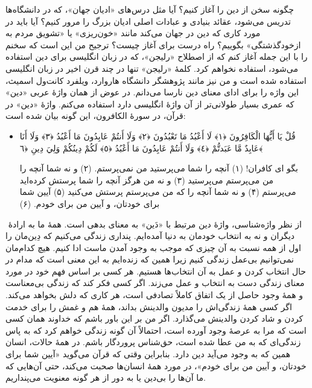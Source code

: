 چگونه سخن از دین را آغاز کنیم؟ آیا مثل درس‌های «ادیان جهان»، که در دانشگاه‌ها تدریس می‌شود، عقائد بنیادی و عبادات اصلی ادیان بزرگ را مرور کنیم؟ آیا باید در مورد کاری که دین در جهان می‌کند مانند «خون‌ریزی» یا «تشویق مردم به ازخودگذشتگی» بگوییم؟ راه درست برای آغاز چیست؟ ترجیح من این است که سخنم را با این جمله آغاز کنم که از اصطلاح «رلیجن»،
که در زبان انگلیسی برای دین استفاده می‌شود، استفاده نخواهم کرد. کلمهٔ «رلیجن» تنها در چند قرن اخیر در زبان انگلیسی استفاده شده است و من نیز مانند پژوهشگر دانشگاه هاروارد، ویلفرد کانت‌ول اسمیث، این واژه را برای ادای معنای دین نارسا می‌دانم. در عوض از همان واژهٔ عربی «دین» که عمری بسیار طولانی‌تر از آن واژهٔ انگلیسی دارد استفاده می‌کنم. واژهٔ «دین» در قرآن، در سورهٔ الکافرون، این گونه بیان شده است:

\begin{itemize}
	\item[]
	
	{
		قُلْ يَا أَيُّهَا الْكَافِرُونَ ﴿١﴾ لَا أَعْبُدُ مَا تَعْبُدُونَ ﴿٢﴾ وَلَا أَنتُمْ عَابِدُونَ مَا أَعْبُدُ ﴿٣﴾ وَلَا أَنَا عَابِدٌ مَّا عَبَدتُّمْ ﴿٤﴾ وَلَا أَنتُمْ عَابِدُونَ مَا أَعْبُدُ ﴿٥﴾ لَكُمْ دِينُكُمْ وَلِيَ دِينِ ﴿٦﴾
	}
	
	{
		بگو ای کافران! (۱) آنچه را شما می‌پرستید من نمی‌پرستم. (۲) و نه شما آنچه را من می‌پرستم می‌پرستید (۳) و نه من هرگز آنچه را شما پرستش کرده‌اید می‌پرستم (۴) و نه شما آنچه را که من می‌پرستم پرستش می‌کنید (۵)  آیین شما برای خودتان، و آیین من برای خودم. (۶)
	}
\end{itemize}
‍‍
از نظر واژه‌شناسی، واژهٔ دین مرتبط با «دَین» به معنای بدهی است. همهٔ ما به ارادهٔ‌ دیگران و نه به انتخاب خودمان به دنیا آمده‌ایم. پنداری زندگی می‌کنیم که دِین‌مان را اول از همه نسبت به آن چیزی که موجب به وجود آمدن ماست ادا کنیم. هیچ کدام‌مان نمی‌توانیم بی‌عمل زندگی کنیم زیرا همین که زنده‌ایم به این معنی است که مدام در حال انتخاب کردن و عمل به آن انتخاب‌ها هستیم. هر کسی بر اساس فهم خود در مورد معنای زندگی دست به انتخاب و عمل می‌زند. اگر کسی فکر کند که زندگی بی‌معناست و همهٔ‌ وجود حاصل از یک اتفاق کاملاً تصادفی است، هر کاری که دلش بخواهد می‌کند. اگر کسی همهٔ زندگی‌اش را مدیون والدینش بداند، همهٔ هم و غمش را برای خدمت کردن و شاد کردن والدینش می‌گذارد. اگر من بر این باور باشم که خداوند همان کسی است که مرا به عرصهٔ وجود آورده است، احتمالاً آن گونه زندگی خواهم کرد که به پاس زندگی‌ای که به من عطا شده است، حق‌شناس پروردگار باشم. در همهٔ حالات، انسان همین که به وجود می‌آید دین دارد. بنابراین وقتی که قرآن می‌گوید «آیین شما برای خودتان، و آیین من برای خودم»، در مورد همهٔ انسان‌ها صحبت می‌کند، حتی آن‌هایی که ما آن‌ها را بی‌دین یا به دور از هر گونه معنویت می‌پنداریم.

